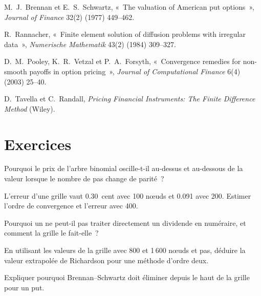 \begin{omsources}
\item M.~J.~Brennan et E.~S.~Schwartz, «~The valuation of American put options~», \emph{Journal of Finance} 32(2) (1977) 449--462.
\item R.~Rannacher, «~Finite element solution of diffusion problems with irregular data~», \emph{Numerische Mathematik} 43(2) (1984) 309--327.
\item D.~M.~Pooley, K.~R.~Vetzal et P.~A.~Forsyth, «~Convergence remedies for non-smooth payoffs in option pricing~», \emph{Journal of
Computational Finance} 6(4) (2003) 25--40.
\item D.~Tavella et C.~Randall, \emph{Pricing Financial Instruments: The Finite Difference Method} (Wiley).
\end{omsources}

\section{Exercices}

\begin{exercise}[$\star$]\label{exo:dv:trees-and-finite-difference-pricers-in-practice:1}
Pourquoi le prix de l'arbre binomial oscille-t-il au-dessus et au-dessous de la valeur lorsque le nombre de pas change de parité~?
\end{exercise}

\begin{exercise}[$\star$]\label{exo:dv:trees-and-finite-difference-pricers-in-practice:2}
L'erreur d'une grille vaut 0.30~cent avec 100 nœuds et 0.091 avec 200. Estimer l'ordre de convergence et l'erreur avec 400.
\end{exercise}

\begin{exercise}[$\star$]\label{exo:dv:trees-and-finite-difference-pricers-in-practice:3}
Pourquoi un  ne peut-il pas traiter directement un dividende en numéraire, et comment la grille le fait-elle~?
\end{exercise}

\begin{exercise}[$\star\star$]\label{exo:dv:trees-and-finite-difference-pricers-in-practice:4}
En utilisant les valeurs de la grille avec 800 et 1\,600 nœuds et pas, déduire la valeur extrapolée de Richardson pour une méthode d'ordre deux.
\end{exercise}

\begin{exercise}[$\star\star$]\label{exo:dv:trees-and-finite-difference-pricers-in-practice:5}
Expliquer pourquoi Brennan--Schwartz doit éliminer depuis le haut de la grille pour un put.
\end{exercise}

